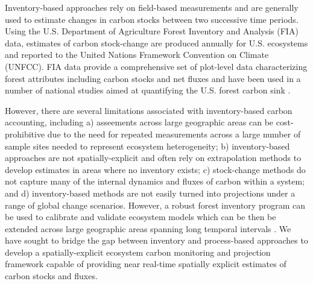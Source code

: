 \documentclass[
]{book}
\begin{document}
Inventory-based approaches rely on field-based measurements and are generally used to estimate changes in carbon stocks between two successive time periods. Using the U.S. Department of Agriculture Forest Inventory and Analysis (FIA) data, estimates of carbon stock-change are produced annually for U.S. ecosystems and reported to the United Nations Framework Convention on Climate (UNFCC)\citep{epa2020inventory}. FIA data provide a comprehensive set of plot-level data characterizing forest attributes including carbon stocks and net fluxes and have been used in a number of national studies aimed at quantifying the U.S. forest carbon sink \citep{birdsey1992carbon, birdsey1995carbon, woodbury2007carbon, goodale2002forest, hayes2012reconciling}.

However, there are several limitations associated with inventory-based carbon accounting, including a) asseements across large geographic areas can be cost-prohibitive due to the need for repeated measurements across a large number of sample sites needed to represent ecosystem heterogeneity; b) inventory-based approaches are not spatially-explicit and often rely on extrapolation methods to develop estimates in areas where no inventory exists; c) stock-change methods do not capture many of the internal dynamics and fluxes of carbon within a system; and d) inventory-based methods are not easily turned into projections under a range of global change scenarios. However, a robust forest inventory program can be used to calibrate and validate ecosystem models which can be then be extended across large geographic areas spanning long temporal intervals \citep{kurz2009cbm, liu2020critical} . We have sought to bridge the gap between inventory and process-based approaches to develop a spatially-explicit ecosystem carbon monitoring and projection framework capable of providing near real-time spatially explicit estimates of carbon stocks and fluxes.
\end{document}
